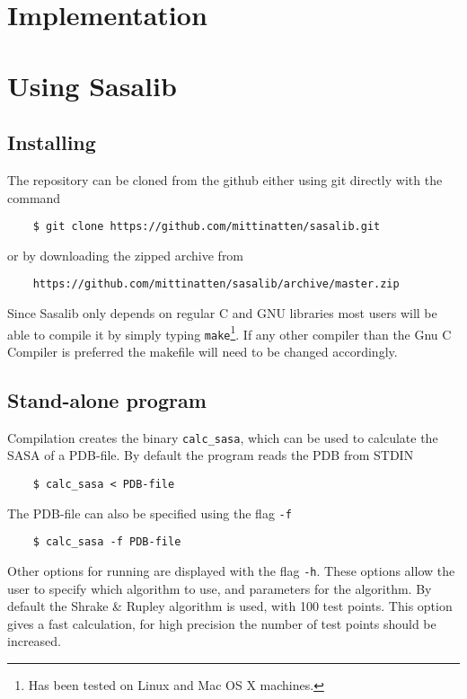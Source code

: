 \documentclass[a4paper,11pt]{article}
\begin{document}
\section{Implementation}

\section{Using Sasalib}

\subsection{Installing}

The repository can be cloned from the github either using git
directly with the command
\begin{verbatim}
    $ git clone https://github.com/mittinatten/sasalib.git
\end{verbatim}
or by downloading the zipped archive from
\begin{verbatim}
    https://github.com/mittinatten/sasalib/archive/master.zip
\end{verbatim}
Since Sasalib only depends on regular C and GNU libraries most users
will be able to compile it by simply typing \texttt{make}\footnote{Has
  been tested on Linux and Mac OS X machines.}. If any other compiler
than the Gnu C Compiler is preferred the makefile will need to be
changed accordingly.

\subsection{Stand-alone program}

Compilation creates the binary \texttt{calc\_sasa}, which can be used
to calculate the SASA of a PDB-file. By default the program reads the
PDB from STDIN
\begin{verbatim} 
    $ calc_sasa < PDB-file    
\end{verbatim}
The PDB-file can also be specified using the flag \texttt{-f}
\begin{verbatim}
    $ calc_sasa -f PDB-file
\end{verbatim}
Other options for running are displayed with the flag
\texttt{-h}. These options allow the user to specify which algorithm
to use, and parameters for the algorithm. By default the Shrake \&
Rupley algorithm is used, with 100 test points. This option gives a
fast calculation, for high precision the number of test points should
be increased.
 
\end{document}
